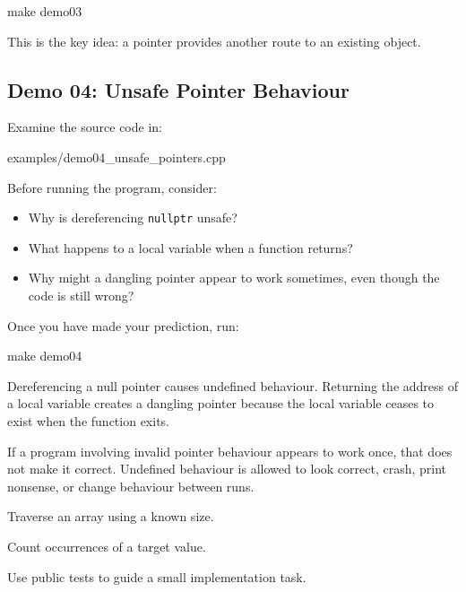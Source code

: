 \documentclass{csc2059practical}
\begin{document}
\begin{bashcode}
make demo03
\end{bashcode}

This is the key idea: a pointer provides another route to an existing object.

\subsection*{Demo 04: Unsafe Pointer Behaviour}

Examine the source code in:

\begin{terminal}
examples/demo04_unsafe_pointers.cpp
\end{terminal}

Before running the program, consider:
\begin{itemize}
  \item Why is dereferencing \texttt{nullptr} unsafe?
  \item What happens to a local variable when a function returns?
  \item Why might a dangling pointer appear to work sometimes, even though the code is still wrong?
\end{itemize}

Once you have made your prediction, run:

\begin{bashcode}
make demo04
\end{bashcode}

\begin{commonerror}
Dereferencing a null pointer causes undefined behaviour. Returning the address of a local variable creates a dangling pointer because the local variable ceases to exist when the function exits.
\end{commonerror}

\begin{tipbox}
If a program involving invalid pointer behaviour appears to work once, that does not make it correct. Undefined behaviour is allowed to look correct, crash, print nonsense, or change behaviour between runs.
\end{tipbox}


\begin{exerciseobjectives}
  \item Traverse an array using a known size.
  \item Count occurrences of a target value.
  \item Use public tests to guide a small implementation task.
\end{exerciseobjectives}
\end{document}
